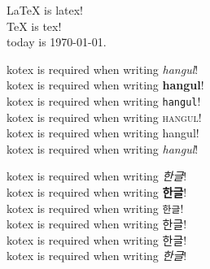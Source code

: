 \documentclass{article}
\begin{document}
\LaTeX{} is latex! \\
\TeX{} is tex!\\
today is \today. \newline

kotex is required when writing \textsl{hangul}! \\
kotex is required when writing \textbf{hangul}! \\
kotex is required when writing \texttt{hangul}! \\
kotex is required when writing \textsc{hangul}! \\
kotex is required when writing \textsf{hangul}! \\
kotex is required when writing \textit{hangul}! \newline

kotex is required when writing \textsl{한글}! \\
kotex is required when writing \textbf{한글}! \\
kotex is required when writing \texttt{한글}! \\
kotex is required when writing \textsc{한글}! \\
kotex is required when writing \textsf{한글}! \\
kotex is required when writing \textit{한글}! \\
\end{document}
